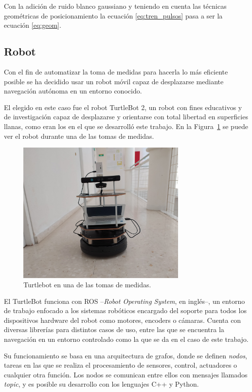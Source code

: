 Con la adición de ruido blanco gaussiano y teniendo en cuenta las técnicas geométricas de posicionamiento la ecuación \eqref{eq:tren_pulsos} pasa a ser la ecuación \eqref{eq:geom}.

\subsection{Robot}

Con el fin de automatizar la toma de medidas para hacerla lo más eficiente posible se ha decidido usar un robot móvil capaz de desplazarse mediante navegación autónoma en un entorno conocido.

El elegido en este caso fue el robot TurtleBot 2, un robot con fines educativos y de investigación capaz de desplazarse y orientarse con total libertad en superficies llanas, como eran los en el que se desarrolló este trabajo.
En la Figura~\ref{fig:robot} se puede ver el robot durante una de las tomas de medidas.

\begin{figure}[H]
    \centering
    \includegraphics[width=0.75\textwidth]{pic/robot_fisica.jpg}
    \caption{Turtlebot en una de las tomas de medidas.}
    \label{fig:robot}
\end{figure}

El TurtleBot funciona con ROS --\textit{Robot Operating System}, en inglés--, un entorno de trabajo enfocado a los sistemas robóticos encargado del soporte para todos los dispositivos hardware del robot como motores, encoders o cámaras. 
Cuenta con diversas librerías para distintos casos de uso, entre las que se encuentra la navegación en un entorno controlado como la que se da en el caso de este trabajo.

Su funcionamiento se basa en una arquitectura de grafos, donde se definen \textit{nodos}, tareas en las que se realiza el procesamiento de sensores, control, actuadores o cualquier otra función.
Los nodos se comunican entre ellos con mensajes llamados \textit{topic}, y es posible su desarrollo con los lenguajes C++ y Python.

